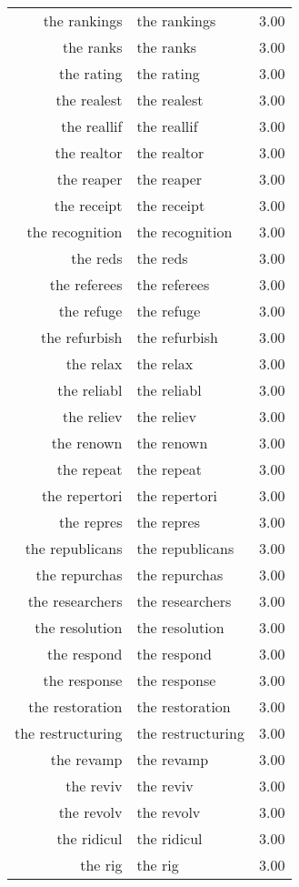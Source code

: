\begin{table}[ht]
\begin{tabular}{rlr}
  the rankings & the rankings & 3.00 \\ 
  the ranks & the ranks & 3.00 \\ 
  the rating & the rating & 3.00 \\ 
  the realest & the realest & 3.00 \\ 
  the reallif & the reallif & 3.00 \\ 
  the realtor & the realtor & 3.00 \\ 
  the reaper & the reaper & 3.00 \\ 
  the receipt & the receipt & 3.00 \\ 
  the recognition & the recognition & 3.00 \\ 
  the reds & the reds & 3.00 \\ 
  the referees & the referees & 3.00 \\ 
  the refuge & the refuge & 3.00 \\ 
  the refurbish & the refurbish & 3.00 \\ 
  the relax & the relax & 3.00 \\ 
  the reliabl & the reliabl & 3.00 \\ 
  the reliev & the reliev & 3.00 \\ 
  the renown & the renown & 3.00 \\ 
  the repeat & the repeat & 3.00 \\ 
  the repertori & the repertori & 3.00 \\ 
  the repres & the repres & 3.00 \\ 
  the republicans & the republicans & 3.00 \\ 
  the repurchas & the repurchas & 3.00 \\ 
  the researchers & the researchers & 3.00 \\ 
  the resolution & the resolution & 3.00 \\ 
  the respond & the respond & 3.00 \\ 
  the response & the response & 3.00 \\ 
  the restoration & the restoration & 3.00 \\ 
  the restructuring & the restructuring & 3.00 \\ 
  the revamp & the revamp & 3.00 \\ 
  the reviv & the reviv & 3.00 \\ 
  the revolv & the revolv & 3.00 \\ 
  the ridicul & the ridicul & 3.00 \\ 
  the rig & the rig & 3.00 \\ 

\end{tabular}
\end{table}
